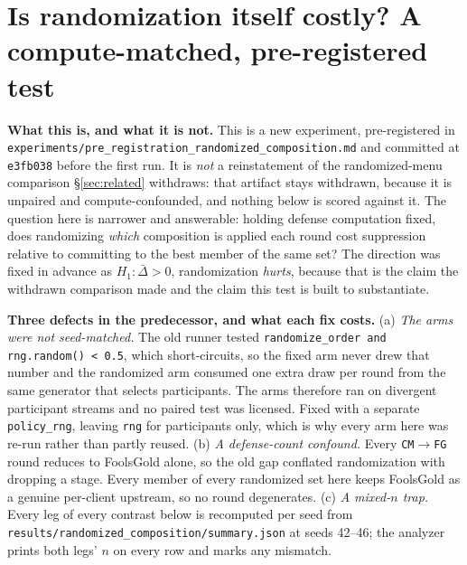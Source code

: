 \documentclass{article}
\begin{document}
\section{Is randomization itself costly? A compute-matched, pre-registered test}
\label{app:randomization}

\textbf{What this is, and what it is not.} This is a new experiment, pre-registered in
\texttt{experiments/}\allowbreak\texttt{pre\_registration\_randomized\_composition.md} and committed at
\texttt{e3fb038} before the first run. It is \emph{not} a reinstatement of the randomized-menu comparison
§\ref{sec:related} withdraws: that artifact stays withdrawn, because it is unpaired and
compute-confounded, and nothing below is scored against it. The question here is narrower and answerable:
holding defense computation fixed, does randomizing \emph{which} composition is applied each round cost
suppression relative to committing to the best member of the same set? The direction was fixed in advance
as $H_1: \bar{\Delta} > 0$, randomization \emph{hurts}, because that is the claim the withdrawn
comparison made and the claim this test is built to substantiate.

\textbf{Three defects in the predecessor, and what each fix costs.} (a) \emph{The arms were not
seed-matched.} The old runner tested \texttt{randomize\_order and rng.random() < 0.5}, which
short-circuits, so the fixed arm never drew that number and the randomized arm consumed one extra draw
per round from the same generator that selects participants. The arms therefore ran on divergent
participant streams and no paired test was licensed. Fixed with a separate \texttt{policy\_rng}, leaving
\texttt{rng} for participants only, which is why every arm here was re-run rather than partly reused.
(b) \emph{A defense-count confound.} Every \texttt{CM}$\to$\texttt{FG} round reduces to FoolsGold alone,
so the old gap conflated randomization with dropping a stage. Every member of every randomized set here
keeps FoolsGold as a genuine per-client upstream, so no round degenerates. (c) \emph{A mixed-$n$ trap.}
Every leg of every contrast below is recomputed per seed from
\texttt{results/}\allowbreak\texttt{randomized\_composition/}\allowbreak\texttt{summary.json} at seeds
42--46; the analyzer prints both legs' $n$ on every row and marks any mismatch.
\end{document}
